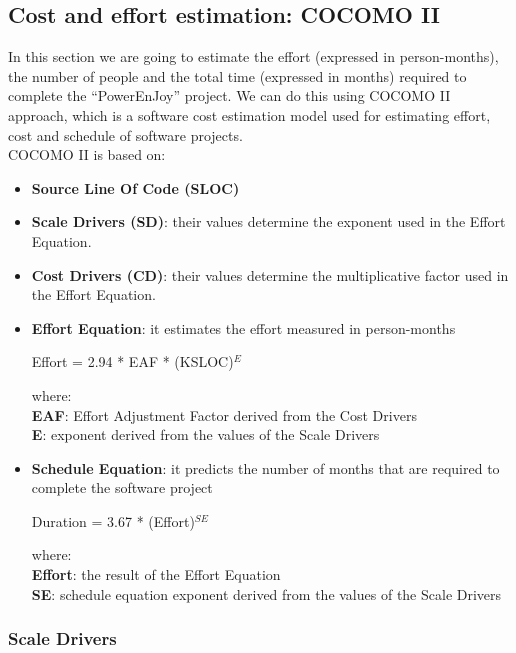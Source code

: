 \pagebreak
\subsection{Cost and effort estimation: COCOMO II}

In this section we are going to estimate the effort (expressed in person-months), the number of people and the total time (expressed in months) required to complete the ``PowerEnJoy'' project.
We can do this using COCOMO II approach, which is a software cost estimation model used for estimating effort, cost and schedule of software projects. \\

COCOMO II is based on: 
\begin{itemize}
	\item \textbf{Source Line Of Code (SLOC)}
	\item \textbf{Scale Drivers (SD)}: their values determine the exponent used in the Effort Equation.
	\item \textbf{Cost Drivers (CD)}: their values determine the multiplicative factor used in the Effort Equation.
	\item \textbf{Effort Equation}: it estimates the effort measured in person-months
	\begin{center}
		 Effort = 2.94 * EAF * (KSLOC)$^{E}$
	\end{center}
	where: \\
	\textbf{EAF}: Effort Adjustment Factor derived from the Cost Drivers \\
	\textbf{E}: exponent derived from the values of the Scale Drivers
	
	\item \textbf{Schedule Equation}: it predicts the number of months that are required to complete the software project 
	\begin{center}
		Duration = 3.67 * (Effort)$^{SE}$ \\
	\end{center}
	where: \\
	\textbf{Effort}: the result of the Effort Equation \\
	\textbf{SE}: schedule equation exponent derived from the values of the Scale Drivers
\end{itemize}

\subsubsection{Scale Drivers}

